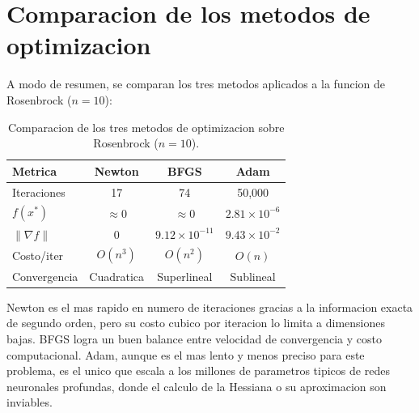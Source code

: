 \documentclass{article}
\begin{document}
\section{Comparacion de los metodos de optimizacion}

A modo de resumen, se comparan los tres metodos aplicados a la funcion de Rosenbrock ($n = 10$):

\begin{table}[H]
\centering
\begin{tabular}{lccc}
\hline
\textbf{Metrica} & \textbf{Newton} & \textbf{BFGS} & \textbf{Adam} \\
\hline
Iteraciones       & 17       & 74         & 50,000 \\
$f(x^*)$          & $\approx 0$   & $\approx 0$     & $2.81 \times 10^{-6}$ \\
$\|\nabla f\|$    & $0$      & $9.12 \times 10^{-11}$ & $9.43 \times 10^{-2}$ \\
Costo/iter        & $O(n^3)$ & $O(n^2)$   & $O(n)$ \\
Convergencia      & Cuadratica & Superlineal & Sublineal \\
\hline
\end{tabular}
\caption{Comparacion de los tres metodos de optimizacion sobre Rosenbrock ($n=10$).}
\label{tab:comparacion}
\end{table}

Newton es el mas rapido en numero de iteraciones gracias a la informacion exacta de segundo orden, pero su costo cubico por iteracion lo limita a dimensiones bajas. BFGS logra un buen balance entre velocidad de convergencia y costo computacional. Adam, aunque es el mas lento y menos preciso para este problema, es el unico que escala a los millones de parametros tipicos de redes neuronales profundas, donde el calculo de la Hessiana o su aproximacion son inviables.




\end{document}
